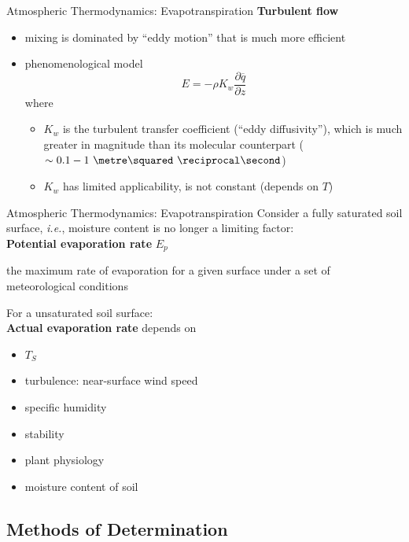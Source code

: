 
\begin{frame}{Atmospheric Thermodynamics: Evapotranspiration}
\textbf{Turbulent flow}
\begin{itemize}
	\item mixing is dominated by ``eddy motion'' that is much more efficient
	\item phenomenological model
	$$E=-\rho K_w \frac{\partial \overline{q}}{\partial z}$$
	where
	\begin{itemize}
		\item $K_w$ is the turbulent transfer coefficient (``eddy diffusivity''), which is much greater in magnitude than its molecular counterpart ($\sim 0.1-1\ \metre\squared\ \reciprocal\second$)
		\item $K_w$ has limited applicability, is not constant (depends on $T$)
	\end{itemize}
\end{itemize}
\end{frame}


\begin{frame}{Atmospheric Thermodynamics: Evapotranspiration}
Consider a fully saturated soil surface, \textit{i.e.}, moisture content is no longer a limiting factor:\\
\textbf{Potential evaporation rate} $E_p$
\begin{fancydefs}
	the maximum rate of evaporation for a given surface under a set of meteorological conditions
\end{fancydefs}

For a unsaturated soil surface:\\
\textbf{Actual evaporation rate} depends on
\begin{itemize}
	\item $T_S$
	\item turbulence: near-surface wind speed
	\item specific humidity
	\item stability
	\item plant physiology
	\item moisture content of soil
\end{itemize}
\end{frame}

\subsection{Methods of Determination}


